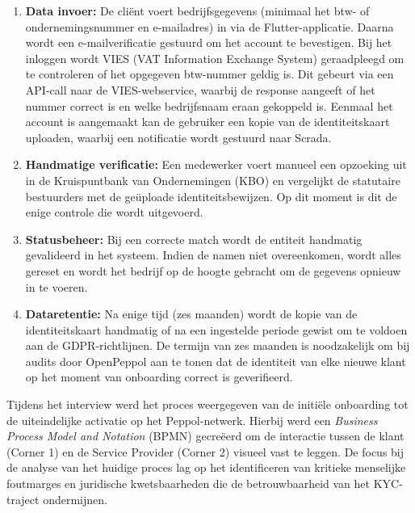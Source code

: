 \begin{enumerate}
    \item \textbf{Data invoer:} De cliënt voert bedrijfsgegevens (minimaal het btw- of ondernemingsnummer en e-mailadres) in via de Flutter-applicatie.
    Daarna wordt een e-mailverificatie gestuurd om het account te bevestigen. Bij het inloggen wordt VIES (VAT Information Exchange System) geraadpleegd om te controleren of het opgegeven btw-nummer geldig is. 
    Dit gebeurt via een API-call naar de VIES-webservice, waarbij de response aangeeft of het nummer correct is en welke bedrijfsnaam eraan gekoppeld is.
    Eenmaal het account is aangemaakt kan de gebruiker een kopie van de identiteitskaart uploaden, waarbij een notificatie wordt gestuurd naar Scrada.
    \item \textbf{Handmatige verificatie:} Een medewerker voert manueel een opzoeking uit in de Kruispuntbank van Ondernemingen (KBO) en vergelijkt de statutaire bestuurders met de geüploade identiteitsbewijzen. Op dit moment is dit de enige 
    controle die wordt uitgevoerd.
    \item \textbf{Statusbeheer:} Bij een correcte match wordt de entiteit handmatig gevalideerd in het systeem. Indien de namen niet overeenkomen, wordt alles gereset en wordt het bedrijf op de hoogte gebracht om de gegevens opnieuw in te voeren.
    \item \textbf{Dataretentie:} Na enige tijd (zes maanden) wordt de kopie van de identiteitskaart handmatig of na een ingestelde periode gewist om te voldoen aan de GDPR-richtlijnen. De termijn van zes maanden is noodzakelijk om bij audits door OpenPeppol aan te tonen dat de identiteit 
    van elke nieuwe klant op het moment van onboarding correct is geverifieerd.
\end{enumerate}

Tijdens het interview werd het proces weergegeven van de initiële onboarding tot de uiteindelijke activatie op het Peppol-netwerk. Hierbij werd een \textit{Business Process Model and Notation} (BPMN) gecreëerd
om de interactie tussen de klant (Corner 1) en de Service Provider (Corner 2) visueel vast te leggen. 
De focus bij de analyse van het huidige proces lag op het identificeren van kritieke menselijke foutmarges en juridische kwetsbaarheden die de betrouwbaarheid van het KYC-traject ondermijnen.

